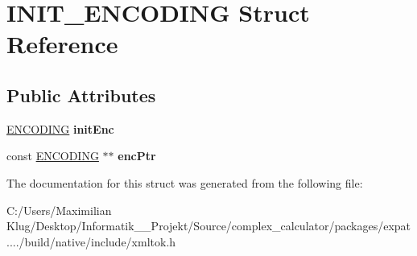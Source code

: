 \hypertarget{struct_i_n_i_t___e_n_c_o_d_i_n_g}{}\section{I\+N\+I\+T\+\_\+\+E\+N\+C\+O\+D\+I\+NG Struct Reference}
\label{struct_i_n_i_t___e_n_c_o_d_i_n_g}
\subsection*{Public Attributes}
\begin{DoxyCompactItemize}
\item 
\mbox{\label{struct_i_n_i_t___e_n_c_o_d_i_n_g_af315cfdb5c933b05fdc0523f4d591221}} 
\mbox{\hyperlink{structencoding}{E\+N\+C\+O\+D\+I\+NG}} {\bfseries init\+Enc}
\item 
\mbox{\label{struct_i_n_i_t___e_n_c_o_d_i_n_g_a88e7b26311a762f388a855e3fbc794f3}} 
const \mbox{\hyperlink{structencoding}{E\+N\+C\+O\+D\+I\+NG}} $\ast$$\ast$ {\bfseries enc\+Ptr}
\end{DoxyCompactItemize}


The documentation for this struct was generated from the following file\+:\begin{DoxyCompactItemize}
\item 
C\+:/\+Users/\+Maximilian Klug/\+Desktop/\+Informatik\+\_\+\_\+\+Projekt/\+Source/complex\+\_\+calculator/packages/expat..../build/native/include/xmltok.\+h\end{DoxyCompactItemize}
